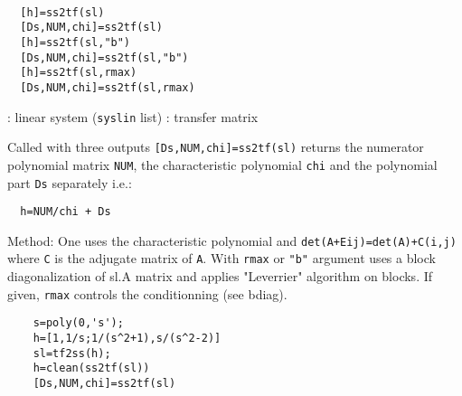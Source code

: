 \begin{mandesc}
   \\ %
\end{mandesc}
\begin{calling_sequence}
\begin{verbatim}
  [h]=ss2tf(sl)   
  [Ds,NUM,chi]=ss2tf(sl)  
  [h]=ss2tf(sl,"b")   
  [Ds,NUM,chi]=ss2tf(sl,"b")  
  [h]=ss2tf(sl,rmax)   
  [Ds,NUM,chi]=ss2tf(sl,rmax)  
\end{verbatim}
\end{calling_sequence}
\begin{parameters}
  \begin{varlist}
    : linear system (\verb!syslin! list)
    : transfer matrix
  \end{varlist}
\end{parameters}
\begin{mandescription}
  Called with three outputs \verb![Ds,NUM,chi]=ss2tf(sl)! returns 
  the numerator polynomial matrix \verb!NUM!, the characteristic
  polynomial \verb!chi! and the polynomial part \verb!Ds! separately i.e.:
\begin{verbatim}
  h=NUM/chi + Ds
\end{verbatim}
Method:
One uses the characteristic polynomial and 
\verb!det(A+Eij)=det(A)+C(i,j)! where \verb!C! is the adjugate 
matrix of \verb!A!.
With \verb!rmax! or \verb!"b"! argument uses a block diagonalization of
sl.A matrix and applies "Leverrier" algorithm on blocks.
If given, \verb!rmax! controls the conditionning (see bdiag).
\end{mandescription}
\begin{examples}
  \begin{Verbatim}
    s=poly(0,'s');
    h=[1,1/s;1/(s^2+1),s/(s^2-2)]
    sl=tf2ss(h);
    h=clean(ss2tf(sl))
    [Ds,NUM,chi]=ss2tf(sl)
  \end{Verbatim}
\end{examples}
\begin{manseealso}
    
     
\end{manseealso}
